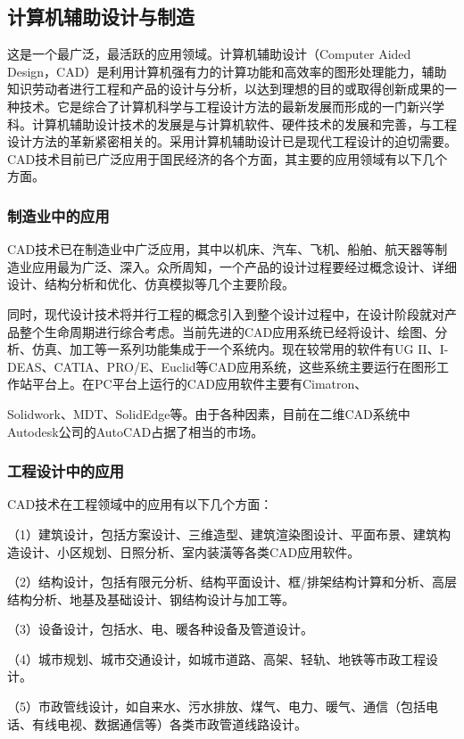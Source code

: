 \documentclass[UTF8]{article}
\begin{document}
\subsection{计算机辅助设计与制造}

这是一个最广泛，最活跃的应用领域。计算机辅助设计（Computer Aided Design，CAD）是利用计算机强有力的计算功能和高效率的图形处理能力，辅助知识劳动者进行工程和产品的设计与分析，以达到理想的目的或取得创新成果的一种技术。它是综合了计算机科学与工程设计方法的最新发展而形成的一门新兴学科。计算机辅助设计技术的发展是与计算机软件、硬件技术的发展和完善，与工程设计方法的革新紧密相关的。采用计算机辅助设计已是现代工程设计的迫切需要。CAD技术目前已广泛应用于国民经济的各个方面，其主要的应用领域有以下几个方面。
\subsubsection{制造业中的应用}

CAD技术已在制造业中广泛应用，其中以机床、汽车、飞机、船舶、航天器等制造业应用最为广泛、深入。众所周知，一个产品的设计过程要经过概念设计、详细设计、结构分析和优化、仿真模拟等几个主要阶段。

同时，现代设计技术将并行工程的概念引入到整个设计过程中，在设计阶段就对产品整个生命周期进行综合考虑。当前先进的CAD应用系统已经将设计、绘图、分析、仿真、加工等一系列功能集成于一个系统内。现在较常用的软件有UG II、I-DEAS、CATIA、PRO/E、Euclid等CAD应用系统，这些系统主要运行在图形工作站平台上。在PC平台上运行的CAD应用软件主要有Cimatron、

Solidwork、MDT、SolidEdge等。由于各种因素，目前在二维CAD系统中Autodesk公司的AutoCAD占据了相当的市场。

\subsubsection{工程设计中的应用}

CAD技术在工程领域中的应用有以下几个方面：

（1）建筑设计，包括方案设计、三维造型、建筑渲染图设计、平面布景、建筑构造设计、小区规划、日照分析、室内装潢等各类CAD应用软件。

（2）结构设计，包括有限元分析、结构平面设计、框/排架结构计算和分析、高层结构分析、地基及基础设计、钢结构设计与加工等。

（3）设备设计，包括水、电、暖各种设备及管道设计。

（4）城市规划、城市交通设计，如城市道路、高架、轻轨、地铁等市政工程设计。

（5）市政管线设计，如自来水、污水排放、煤气、电力、暖气、通信（包括电话、有线电视、数据通信等）各类市政管道线路设计。
\end{document}
